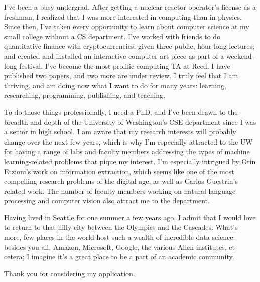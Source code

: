 \documentclass{article}
\begin{document}
I've been a busy undergrad. After getting a nuclear reactor operator's license as a freshman, I realized that I was more interested in computing than in physics. Since then, I've taken every opportunity to learn about computer science at my small college without a CS department. I've worked with friends to do quantitative finance with cryptocurrencies; given three public, hour-long lectures; and created and installed an interactive computer art piece as part of a weekend-long festival. I've become the most prolific computing TA at Reed. I have published two papers, and two more are under review. I truly feel that I am thriving, and am doing now what I want to do for many years: learning, researching, programming, publishing, and teaching.

To do those things professionally, I need a PhD, and I've been drawn to the breadth and depth of the University of Washington's CSE department since I was a senior in high school. I am aware that my research interests will probably change over the next few years, which is why I'm especially attracted to the UW for having a range of labs and faculty members addressing the types of machine learning-related problems that pique my interest. I'm especially intrigued by Orin Etzioni's work on information extraction, which seems like one of the most compelling research problems of the digital age, as well as Carlos Guestrin's related work. The number of faculty members working on natural language processing and computer vision also attract me to the department. 

Having lived in Seattle for one summer a few years ago, I admit that I would love to return to that hilly city between the Olympics and the Cascades. What's more, few places in the world host such a wealth of incredible data science: besides you all, Amazon, Microsoft, Google, the various Allen institutes, et cetera; I imagine it's a great place to be a part of an academic community.

Thank you for considering my application.
\end{document}
